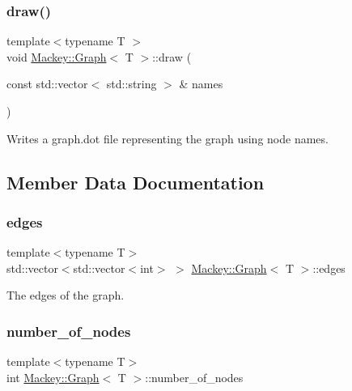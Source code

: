 \subsubsection{\texorpdfstring{draw()}{draw()}\hspace{0.1cm}{\footnotesize\ttfamily [2/2]}}
{\footnotesize\ttfamily template$<$typename T $>$ \\
void \hyperlink{classMackey_1_1Graph}{Mackey\+::\+Graph}$<$ T $>$\+::draw (\begin{DoxyParamCaption}\item[{const std\+::vector$<$ std\+::string $>$ \&}]{names }\end{DoxyParamCaption})}



Writes a graph.\+dot file representing the graph using node names. 



\subsection{Member Data Documentation}
\mbox{\label{classMackey_1_1Graph_a729ec24b9f9e504f4c4e2d3f6e2cab83}} 
\subsubsection{\texorpdfstring{edges}{edges}}
{\footnotesize\ttfamily template$<$typename T$>$ \\
std\+::vector$<$std\+::vector$<$int$>$ $>$ \hyperlink{classMackey_1_1Graph}{Mackey\+::\+Graph}$<$ T $>$\+::edges\hspace{0.3cm}{\ttfamily [protected]}}



The edges of the graph. 

\mbox{\label{classMackey_1_1Graph_a6b275a20b0571d4b51fbfa3e596cd67a}} 
\subsubsection{\texorpdfstring{number\+\_\+of\+\_\+nodes}{number\_of\_nodes}}
{\footnotesize\ttfamily template$<$typename T$>$ \\
int \hyperlink{classMackey_1_1Graph}{Mackey\+::\+Graph}$<$ T $>$\+::number\+\_\+of\+\_\+nodes}



